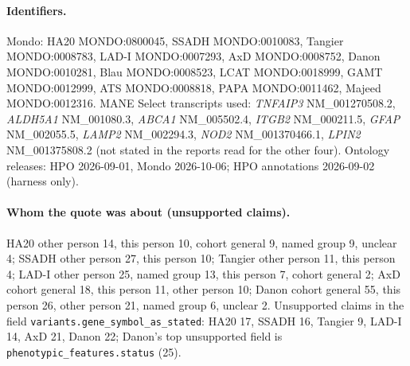 \documentclass{article} %
\begin{document}
\paragraph{Identifiers.} Mondo: HA20 MONDO:0800045, SSADH MONDO:0010083, Tangier MONDO:0008783, LAD-I MONDO:0007293, AxD MONDO:0008752, Danon MONDO:0010281, Blau MONDO:0008523, LCAT MONDO:0018999, GAMT MONDO:0012999, ATS MONDO:0008818, PAPA MONDO:0011462, Majeed MONDO:0012316. MANE Select transcripts used: \emph{TNFAIP3} NM\_001270508.2, \emph{ALDH5A1} NM\_001080.3, \emph{ABCA1} NM\_005502.4, \emph{ITGB2} NM\_000211.5, \emph{GFAP} NM\_002055.5, \emph{LAMP2} NM\_002294.3, \emph{NOD2} NM\_001370466.1, \emph{LPIN2} NM\_001375808.2 (not stated in the reports read for the other four). Ontology releases: HPO 2026-09-01, Mondo 2026-10-06; HPO annotations 2026-09-02 (harness only).

\paragraph{Whom the quote was about (unsupported claims).} HA20 other person 14, this person 10, cohort general 9, named group 9, unclear 4; SSADH other person 27, this person 10; Tangier other person 11, this person 4; LAD-I other person 25, named group 13, this person 7, cohort general 2; AxD cohort general 18, this person 11, other person 10; Danon cohort general 55, this person 26, other person 21, named group 6, unclear 2. Unsupported claims in the field \texttt{variants.gene\_symbol\_as\_stated}: HA20 17, SSADH 16, Tangier 9, LAD-I 14, AxD 21, Danon 22; Danon's top unsupported field is \texttt{phenotypic\_features.status} (25).

\begin{table}[h]
\caption{10\% repeat of the registered six (seed 20261020; 38 papers; no gatekeeper on the repeat).}
\begin{center}
\scriptsize
{}
\end{center}
\end{table}
\end{document}
